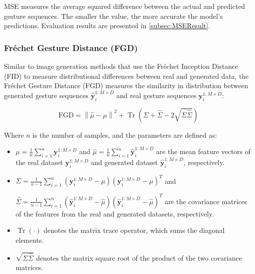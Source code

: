 MSE measures the average squared difference between the actual and predicted gesture sequences. The smaller the value, the more accurate the model's predictions. Evaluation results are presented in \autoref{subsec:MSEResult}.

\subsubsection{Fréchet Gesture Distance (FGD)}

Similar to image generation methods that use the Fréchet Inception Distance (FID) to measure distributional differences between real and generated data, the Fréchet Gesture Distance (FGD) measures the similarity in distribution between generated gesture sequences $\hat{\mathbf{y}}_i^{1:M \times D}$ and real gesture sequences $\mathbf{y}_i^{1:M \times D}$:

\begin{equation}
	\text{FGD} = \left\| \hat{\mu} - \mu \right\|^2 + \operatorname{Tr}\left( \Sigma + \hat{\Sigma} - 2 \sqrt{\Sigma \hat{\Sigma}} \right)
	\label{eq:fidscore}
\end{equation}

Where $n$ is the number of samples, and the parameters are defined as:

\begin{itemize}
	\item $\mu = \frac{1}{n} \sum_{i=1}^n \mathbf{y}_i^{1:M \times D}$ and $\hat{\mu} = \frac{1}{n} \sum_{i=1}^n \hat{\mathbf{y}}_i^{1:M \times D}$ are the mean feature vectors of the real dataset $\mathbf{y}_i^{1:M \times D}$ and generated dataset $\hat{\mathbf{y}}_i^{1:M \times D}$, respectively.
	 
	\item $\Sigma = \frac{1}{n-1} \sum_{i=1}^n \left( \mathbf{y}_i^{1:M \times D} - \mu \right) \left( \mathbf{y}_i^{1:M \times D} - \mu \right)^T$ and
	
	$\hat{\Sigma} = \frac{1}{n-1} \sum_{i=1}^n \left( \hat{\mathbf{y}}_i^{1:M \times D} - \hat{\mu} \right) \left( \hat{\mathbf{y}}_i^{1:M \times D} - \hat{\mu} \right)^T$ are the covariance matrices of the features from the real and generated datasets, respectively.
	
	\item $\operatorname{Tr}(\cdot)$ denotes the matrix trace operator, which sums the diagonal elements.
	
	\item $\sqrt{\Sigma \hat{\Sigma}}$ denotes the matrix square root of the product of the two covariance matrices.
\end{itemize}

